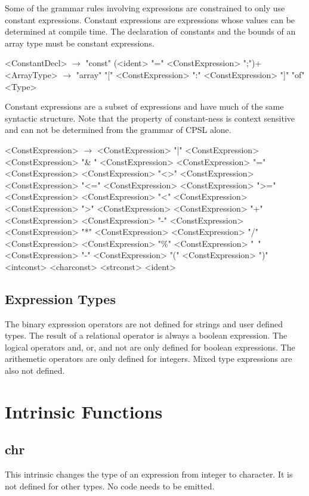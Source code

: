 \documentclass{book}
\begin{document}
Some of the grammar rules involving expressions are constrained to only use constant expressions.
Constant expressions are expressions whose values can be determined at compile time.
The declaration of constants and the bounds of an array type must be constant expressions.
\begin{grammar}
<ConstantDecl> $\rightarrow$ "const" (<ident> "=" <ConstExpression> ";")+
<ArrayType> $\rightarrow$ "array" "[" <ConstExpression> ":" <ConstExpression> "]" "of" <Type>
\end{grammar}

Constant expressions are a subset of expressions and have much of the same syntactic structure.
Note that the property of constant-ness is context sensitive and can not be determined from the grammar of CPSL alone.

\begin{grammar}
<ConstExpression> $\rightarrow$ <ConstExpression> "|" <ConstExpression>
\alt <ConstExpression> "\& " <ConstExpression>
\alt <ConstExpression> "=" <ConstExpression>
\alt <ConstExpression> "<>" <ConstExpression>
\alt <ConstExpression> "<=" <ConstExpression>
\alt <ConstExpression> ">=" <ConstExpression>
\alt <ConstExpression> "<" <ConstExpression>
\alt <ConstExpression> ">" <ConstExpression>
\alt <ConstExpression> "+" <ConstExpression>
\alt <ConstExpression> "-" <ConstExpression>
\alt <ConstExpression> "*" <ConstExpression>
\alt <ConstExpression> "/" <ConstExpression>
\alt <ConstExpression> "\%" <ConstExpression>
\alt "~" <ConstExpression>
\alt "-" <ConstExpression>
\alt "(" <ConstExpression> ")"
\alt <intconst>
\alt <charconst>
\alt <strconst>
\alt <ident>
\end{grammar}

\subsection{Expression Types}
The binary expression operators are not defined for strings and user defined types.
The result of a relational operator is always a boolean expression.
The logical operators and, or, and not are only defined for boolean expressions.
The arithemetic operators are only defined for integers.
Mixed type expressions are also not defined.

\section{Intrinsic Functions}
\subsection{chr}
This intrinsic changes the type of an expression from integer to character.
It is not defined for other types.
No code needs to be emitted.
\end{document}
